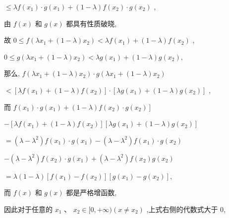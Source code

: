 \documentclass[10pt]{article}
\newcommand*\circled[1]{\tikz[baseline=(char.base)]{\node[shape=circle,draw,inner sep=1.5pt] (char) {\small #1};}}
\begin{document}
\(\leq  {\lambda f}\left( {x}_{1}\right)  \cdot  g\left( {x}_{1}\right)  + \left( {1 - \lambda }\right) f\left( {x}_{2}\right)  \cdot  g\left( {x}_{2}\right)\)  \circled{1} ,

由 \(f\left( x\right)\) 和 \(g\left( x\right)\) 都具有性质破晓,

故 \(0 \leq  f\left( {\lambda {x}_{1} + \left( {1 - \lambda }\right) {x}_{2}}\right)  < {\lambda f}\left( {x}_{1}\right)  + \left( {1 - \lambda }\right) f\left( {x}_{2}\right)\) ,

\(0 \leq  g\left( {\lambda {x}_{1} + \left( {1 - \lambda }\right) {x}_{2}}\right)  < {\lambda g}\left( {x}_{1}\right)  + \left( {1 - \lambda }\right) g\left( {x}_{2}\right) ,\)

那么, \(f\left( {\lambda {x}_{1} + \left( {1 - \lambda }\right) {x}_{2}}\right)  \cdot  g\left( {\lambda {x}_{1} + \left( {1 - \lambda }\right) {x}_{2}}\right)\)

\(< \left\lbrack  {{\lambda f}\left( {x}_{1}\right)  + \left( {1 - \lambda }\right) f\left( {x}_{2}\right) }\right\rbrack   \cdot  \left\lbrack  {{\lambda g}\left( {x}_{1}\right)  + \left( {1 - \lambda }\right) g\left( {x}_{2}\right) }\right\rbrack\) ,

而 \(\left. {f\left( {x}_{1}\right)  \cdot  g\left( {x}_{1}\right)  + \left( {1 - \lambda }\right) f\left( {x}_{2}\right)  \cdot  g\left( {x}_{2}\right) }\right\rbrack\)

\(- \left\lbrack  {{\lambda f}\left( {x}_{1}\right)  + \left( {1 - \lambda }\right) f\left( {x}_{2}\right) }\right\rbrack  \left\lbrack  {{\lambda g}\left( {x}_{1}\right)  + \left( {1 - \lambda }\right) g\left( {x}_{2}\right) }\right\rbrack\)

\(= \left( {\lambda  - {\lambda }^{2}}\right) f\left( {x}_{1}\right)  \cdot  g\left( {x}_{1}\right)  - \left( {\lambda  - {\lambda }^{2}}\right) f\left( {x}_{1}\right)  \cdot  g\left( {x}_{2}\right)\)

\(- \left( {\lambda  - {\lambda }^{2}}\right) f\left( {x}_{2}\right)  \cdot  g\left( {x}_{1}\right)  + \left( {\lambda  - {\lambda }^{2}}\right) f\left( {x}_{2}\right) g\left( {x}_{2}\right)\)

\(= \lambda \left( {1 - \lambda }\right) \left\lbrack  {f\left( {x}_{1}\right)  - f\left( {x}_{2}\right) }\right\rbrack  \left\lbrack  {g\left( {x}_{1}\right)  - g\left( {x}_{2}\right) }\right\rbrack  ,\)

而 \(f\left( x\right)\) 和 \(g\left( x\right)\) 都是严格增函数,

因此对于任意的 \({x}_{1}\text{ 、 }{x}_{2} \in  \lbrack 0, + \infty )\left( {x \neq  {x}_{2}}\right)\) ,上式右侧的代数式大于 0,
\end{document}

